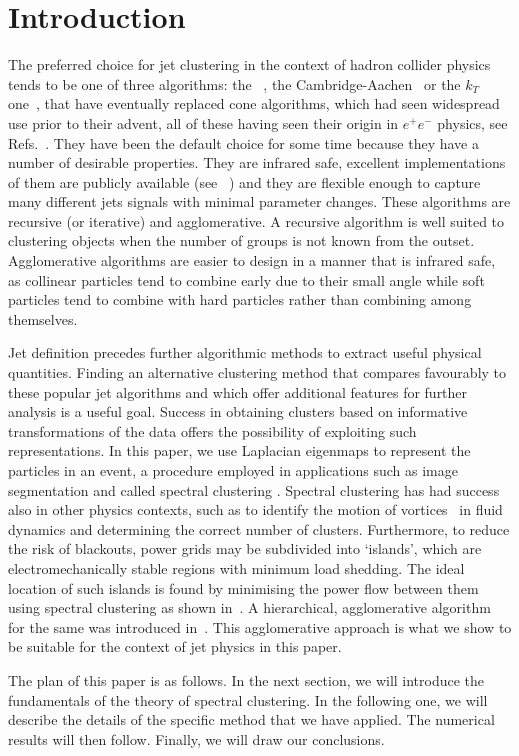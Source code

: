 \section{Introduction}\label{sec:JetClustering}

The preferred choice for jet clustering in the context of hadron collider physics tends to be one of three algorithms:  
the \antikt{}~\cite{Cacciari2008akt}, the Cambridge-Aachen~\cite{Dokshitzer:1997in,Wobisch1998caJet} or the $k_T$  one~\cite{Ellis1993ktJet}, that have  eventually replaced cone algorithms, which had seen widespread use prior to their advent, all of these having seen  their origin in $e^+e^-$ physics, see  Refs.~\cite{Sterman:1977wj,Bethke:1991wk,Catani:1991hj,Moretti:1998qx}.
They have been the default choice for some time because they have a number of desirable properties.
They are infrared safe, excellent implementations of them are publicly available (see \fastjet{}~\cite{Cacciari2011FastJet})
and they are flexible enough to capture many different jets signals with minimal parameter changes.
These algorithms are recursive (or iterative) and agglomerative.
A recursive algorithm is well suited to clustering objects when the number of groups is not known from the outset.
Agglomerative algorithms are easier to design in a manner that is infrared safe,
as collinear particles tend to combine early due to their small angle while
 soft particles tend to combine with hard particles rather than combining  among themselves.

Jet definition precedes further algorithmic methods to extract useful
physical quantities. Finding an alternative clustering method that compares favourably to
these popular jet algorithms and which offer additional features for further analysis is a
useful goal. Success in obtaining clusters based on informative transformations of the data
offers the possibility of exploiting such representations.
In this paper, we use Laplacian eigenmaps \cite{BelkinNiyogi2003} to represent the particles
in an event, a procedure employed in applications such as image segmentation \cite{ShiMalik1997}
and called spectral clustering \cite{NgJordanWeiss2002}.
Spectral clustering has had success also in other physics contexts, such as to identify the motion
of vortices~\cite{hadjighasem2016votex} in fluid dynamics and determining the correct number of clusters.
Furthermore, to reduce the risk of blackouts, power grids may be subdivided into `islands',
which are
electromechanically stable regions with minimum load shedding.
The ideal location of such islands is found by minimising the power flow between them using spectral clustering as shown in~\cite{Li2005}.  A hierarchical, agglomerative algorithm for the same was introduced in~\cite{fennelly2014power}.
This agglomerative approach is what we show to be suitable for the context of jet physics in this paper.

The plan of this paper is as follows. In the next section, we will introduce the fundamentals of the theory of spectral clustering. In the following one, we will describe the details of the specific method that we have applied. The numerical results will then follow. Finally, we will draw our conclusions. 
